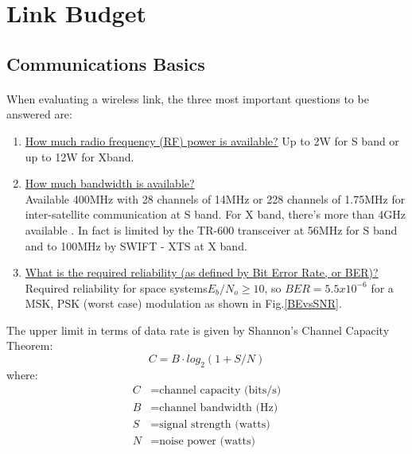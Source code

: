 \section{Link Budget} \label{Appendix:LinkBudget}

\subsection{Communications Basics}
\paragraph{}
When evaluating a wireless link, the three most important questions to be answered are: \cite{Note1998}\\

\begin{enumerate}
	\item \underline{How much radio frequency (RF) power is available?}
	Up to 2W for S band or up to 12W for Xband.
	\item \underline{How much bandwidth is available?}\\

Available 400MHz with 28 channels of 14MHz or 228 channels of 1.75MHz for inter-satellite communication at S band. For X band, there's more than 4GHz available \cite{SecretariadeEstadodetelecomunicacionesyparalasociedaddelainformacion.2015}. In fact is limited by the TR-600 transceiver at 56MHz for S band and to 100MHz by SWIFT - XTS at X band.
	\item \underline{What is the required reliability (as defined by Bit Error Rate, or BER)?}\\
	
Required reliability for space systems$E_b/N_o \geq 10$, so $BER=5.5x10^{-6}$ for a MSK, PSK (worst case) modulation as shown in Fig.\ref{BEvsSNR}.
\end{enumerate}

The upper limit in terms of data rate is given by Shannon's Channel Capacity Theorem:
\begin{equation}
	C=B\cdot log_2(1+S/N)
	\label{channelCapacity}
\end{equation}
where:
\begin{align*}
	C&= \text{channel capacity (bits/s)}\\
	B&= \text{channel bandwidth (Hz)}\\
	S&= \text{signal strength (watts)}\\
	N&= \text{noise power (watts)}
\end{align*}

